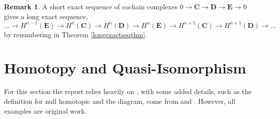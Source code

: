 \documentclass[11.5pt, twoside, a4paper, titlepage]{report}
\theoremstyle{definition}
\newtheorem{rem}[mydef]{Remark}
\theoremstyle{plain}
\begin{document}
\begin{rem}
A short exact sequence of cochain complexes $0\xrightarrow{}\mathbf{C}\xrightarrow{}\mathbf{D} \xrightarrow{} \mathbf{E}\xrightarrow{}0$ gives a long exact sequence,
\begin{equation*}
\dots \xrightarrow{} H^{n-1}(\mathbf{E})\xrightarrow{}H^n(\mathbf{C})\xrightarrow{}H^n(\mathbf{D})\xrightarrow{}H^n(\mathbf{E})\xrightarrow{} H^{n+1}(\mathbf{C})\xrightarrow{} H^{n+1}(\mathbf{D})\xrightarrow{} \dots
\end{equation*}
by renumbering in Theorem \ref{longexactseqthm}.
\end{rem}


\section{Homotopy and Quasi-Isomorphism}

For this section the report relies heavily on \cite{CB1}, with some added details, such as the definition for null homotopic and the diagram, come from \cite{Weibel} and \cite{Rotman}. However, all examples are original work.
\end{document}

